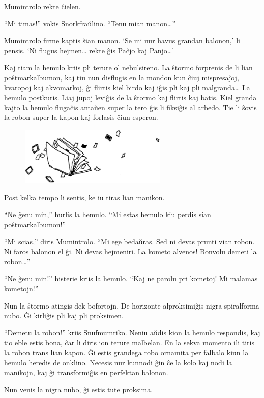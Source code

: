 Mumintrolo rekte ĉielen.

``Mi timas!'' vokis Snorkfraŭlino. ``Tenu mian manon{\ldots}''

Mumintrolo firme kaptis ŝian manon. `Se mi nur havus grandan balonon,' li pensis. `Ni flugus hejmen{\ldots} rekte ĝis Paĉjo kaj Panjo{\ldots}'

Kaj tiam la hemulo kriis pli terure ol nebulsireno. La ŝtormo forprenis de li lian poŝtmarkalbumon, kaj tiu nun disflugis en la mondon kun ĉiuj mispresaĵoj, kvaropoj kaj akvomarkoj, ĝi flirtis kiel birdo kaj iĝis pli kaj pli malgranda{\ldots} La hemulo postkuris. Liaj jupoj leviĝis de la ŝtormo kaj flirtis kaj batis. Kiel granda kajto la hemulo flugaĉis antaŭen super la tero ĝis li fiksiĝis al arbedo. Tie li ŝovis la robon super la kapon kaj forlasis ĉiun esperon.

\begin{figure}[htbp]
\centering
\includegraphics[width=200pt,height=79pt]{8-7.png}
\caption{}
\label{8-7}
\end{figure}

Post kelka tempo li sentis, ke iu tiras lian manikon.

``Ne ĝenu min,'' hurlis la hemulo. ``Mi estas hemulo kiu perdis sian poŝtmarkalbumon!''

``Mi scias,'' diris Mumintrolo. ``Mi ege bedaŭras. Sed ni devas prunti vian robon. Ni faros balonon el ĝi. Ni devas hejmeniri. La kometo alvenos! Bonvolu demeti la robon{\ldots}''

``Ne ĝenu min!'' histerie kriis la hemulo. ``Kaj ne parolu pri kometoj! Mi malamas kometojn!''

Nun la ŝtormo atingis dek bofortojn. De horizonte alproksimiĝis nigra spiralforma nubo. Ĝi kirliĝis pli kaj pli proksimen.

``Demetu la robon!'' kriis Snufmumriko. Neniu aŭdis kion la hemulo respondis, kaj tio eble estis bona, ĉar li diris ion terure malbelan. En la sekva momento ili tiris la robon trans lian kapon. Ĝi estis grandega robo ornamita per falbalo kiun la hemulo heredis de onklino. Necesis nur kunnodi ĝin ĉe la kolo kaj nodi la manikojn, kaj ĝi transformiĝis en perfektan balonon.

Nun venis la nigra nubo, ĝi estis tute proksima.

